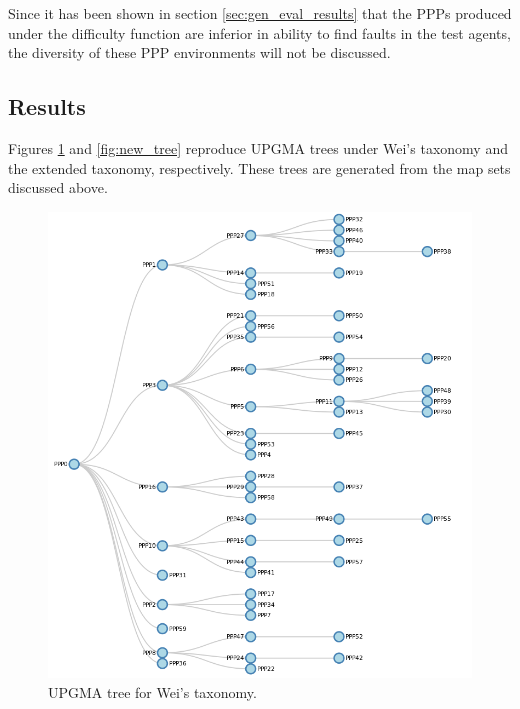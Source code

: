 \documentclass[authoryearcitations]{UoYCSproject}
\begin{document}
Since it has been shown in section \ref{sec:gen_eval_results} that the PPPs produced under the difficulty function are inferior in ability to find faults in the test agents, the diversity of these PPP environments will not be discussed.

\subsection{Results}
\label{sec:div_eval_res}
Figures \ref{fig:wei_tree} and \ref{fig:new_tree} reproduce UPGMA trees under Wei's taxonomy and the extended taxonomy, respectively. These trees are generated from the map sets discussed above.

\begin{figure}
\graphicspath{ {EvalPics/} }
\includegraphics[scale=0.5]{wei_tree.png}
\caption{UPGMA tree for Wei's taxonomy.}
\label{fig:wei_tree}
\end{figure}
\end{document}
